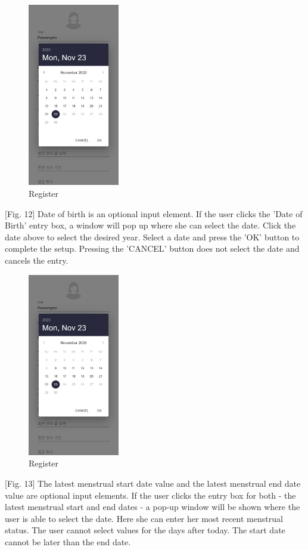 \documentclass[conference]{IEEEtran}
\begin{document}
\begin{itemize}
    \begin{figure}[htbp]
    \includegraphics[width=4cm, height=8cm, center]{register7.png}
    \caption{Register}
    \label{fig12}
    \end{figure}
    
    [Fig. 12] Date of birth is an optional input element. If the user clicks the 'Date of Birth' entry box, a window will pop up where she can select the date. Click the date above to select the desired year. Select a date and press the 'OK' button to complete the setup. Pressing the 'CANCEL' button does not select the date and cancels the entry.
    
    \begin{figure}[htbp]
    \includegraphics[width=4cm, height=8cm, center]{register8.png}
    \caption{Register}
    \label{fig13}
    \end{figure}
    
    [Fig. 13] The latest menstrual start date value and the latest menstrual end date value are optional input elements. If the user clicks the entry box for both - the latest menstrual start and end dates - a pop-up window will be shown where the user is able to select the date. Here she can enter her most recent menstrual status. The user cannot select values for the days after today. The start date cannot be later than the end date.
    

\end{itemize}
\end{document}
